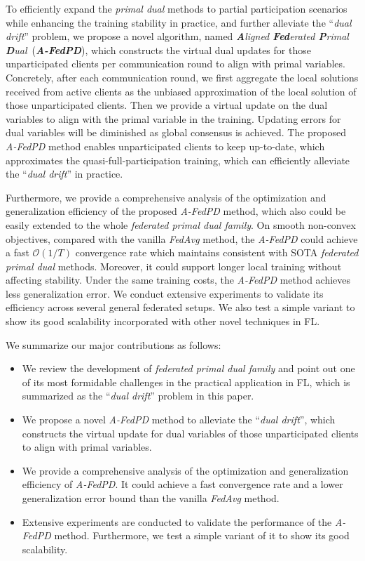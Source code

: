 To efficiently expand the \textit{primal dual} methods to partial participation scenarios while enhancing the training stability in practice, and further alleviate the ``\textit{dual drift}'' problem, we propose a novel algorithm, named \textit{\textbf{A}ligned \textbf{Fed}erated \textbf{P}rimal \textbf{D}ual}~(\textit{\textbf{A-FedPD}}), which constructs the virtual dual updates for those unparticipated clients per communication round to align with primal variables. Concretely, after each communication round, we first aggregate the local solutions received from active clients as the unbiased approximation of the local solution of those unparticipated clients. Then we provide a virtual update on the dual variables to align with the primal variable in the training. Updating errors for dual variables will be diminished as global consensus is achieved. The proposed \textit{A-FedPD} method enables unparticipated clients to keep up-to-date, which approximates the quasi-full-participation training, which can efficiently alleviate the ``\textit{dual drift}'' in practice.

Furthermore, we provide a comprehensive analysis of the optimization and generalization efficiency of the proposed \textit{A-FedPD} method, which also could be easily extended to the whole \textit{federated primal dual family}. On smooth non-convex objectives, compared with the vanilla \textit{FedAvg} method, the \textit{A-FedPD} could achieve a fast $\mathcal{O}(1/T)$ convergence rate which maintains consistent with SOTA \textit{federated primal dual} methods. Moreover, it could support longer local training without affecting stability. Under the same training costs, the \textit{A-FedPD} method achieves less generalization error. We conduct extensive experiments to validate its efficiency across several general federated setups. We also test a simple variant to show its good scalability incorporated with other novel techniques in FL.

We summarize our major contributions as follows:
\begin{itemize}
    \item We review the development of \textit{federated primal dual family} and point out one of its most formidable challenges in the practical application in FL, which is summarized as the ``\textit{dual drift}'' problem in this paper.
    \item We propose a novel \textit{A-FedPD} method to alleviate the ``\textit{dual drift}'', which constructs the virtual update for dual variables of those unparticipated clients to align with primal variables.
    \item We provide a comprehensive analysis of the optimization and generalization efficiency of \textit{A-FedPD}. It could achieve a fast convergence rate and a lower generalization error bound than the vanilla \textit{FedAvg} method.
    \item Extensive experiments are conducted to validate the performance of the \textit{A-FedPD} method. Furthermore, we test a simple variant of it to show its good scalability.
\end{itemize}



